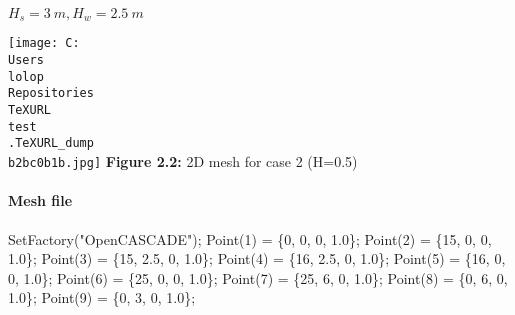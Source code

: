 \documentclass[11pt]{article}
\newenvironment{Shaded}{}{}
\newcommand{\DecValTok}[1]{\textcolor[rgb]{0.25,0.63,0.44}{{#1}}}
\newcommand{\FloatTok}[1]{\textcolor[rgb]{0.25,0.63,0.44}{{#1}}}
\newcommand{\StringTok}[1]{\textcolor[rgb]{0.25,0.44,0.63}{{#1}}}
\newcommand{\NormalTok}[1]{{#1}}
\newcommand{\OperatorTok}[1]{\textcolor[rgb]{0.40,0.40,0.40}{{#1}}}
\begin{document}
\(H_s = 3\ m, H_w = 2.5\ m\)

\texttt{[image: C:\\Users\\lolop\\Repositories\\TeXURL\\test\\.TeXURL\_dump\\b2bc0b1b.jpg]} \textbf{Figure 2.2:}
2D mesh for case 2 (H=0.5)

\hypertarget{mesh-file-1}{%
\paragraph{Mesh file}\label{mesh-file-1}}

\begin{Shaded}
\begin{Highlighting}[]
\NormalTok{SetFactory}\OperatorTok{(}\StringTok{"OpenCASCADE"}\OperatorTok{);}
\NormalTok{Point}\OperatorTok{(}\DecValTok{1}\OperatorTok{)} \OperatorTok{=} \OperatorTok{\{}\DecValTok{0}\OperatorTok{,} \DecValTok{0}\OperatorTok{,} \DecValTok{0}\OperatorTok{,} \FloatTok{1.0}\OperatorTok{\};}
\NormalTok{Point}\OperatorTok{(}\DecValTok{2}\OperatorTok{)} \OperatorTok{=} \OperatorTok{\{}\DecValTok{15}\OperatorTok{,} \DecValTok{0}\OperatorTok{,} \DecValTok{0}\OperatorTok{,} \FloatTok{1.0}\OperatorTok{\};}
\NormalTok{Point}\OperatorTok{(}\DecValTok{3}\OperatorTok{)} \OperatorTok{=} \OperatorTok{\{}\DecValTok{15}\OperatorTok{,} \FloatTok{2.5}\OperatorTok{,} \DecValTok{0}\OperatorTok{,} \FloatTok{1.0}\OperatorTok{\};}
\NormalTok{Point}\OperatorTok{(}\DecValTok{4}\OperatorTok{)} \OperatorTok{=} \OperatorTok{\{}\DecValTok{16}\OperatorTok{,} \FloatTok{2.5}\OperatorTok{,} \DecValTok{0}\OperatorTok{,} \FloatTok{1.0}\OperatorTok{\};}
\NormalTok{Point}\OperatorTok{(}\DecValTok{5}\OperatorTok{)} \OperatorTok{=} \OperatorTok{\{}\DecValTok{16}\OperatorTok{,} \DecValTok{0}\OperatorTok{,} \DecValTok{0}\OperatorTok{,} \FloatTok{1.0}\OperatorTok{\};}
\NormalTok{Point}\OperatorTok{(}\DecValTok{6}\OperatorTok{)} \OperatorTok{=} \OperatorTok{\{}\DecValTok{25}\OperatorTok{,} \DecValTok{0}\OperatorTok{,} \DecValTok{0}\OperatorTok{,} \FloatTok{1.0}\OperatorTok{\};}
\NormalTok{Point}\OperatorTok{(}\DecValTok{7}\OperatorTok{)} \OperatorTok{=} \OperatorTok{\{}\DecValTok{25}\OperatorTok{,} \DecValTok{6}\OperatorTok{,} \DecValTok{0}\OperatorTok{,} \FloatTok{1.0}\OperatorTok{\};}
\NormalTok{Point}\OperatorTok{(}\DecValTok{8}\OperatorTok{)} \OperatorTok{=} \OperatorTok{\{}\DecValTok{0}\OperatorTok{,} \DecValTok{6}\OperatorTok{,} \DecValTok{0}\OperatorTok{,} \FloatTok{1.0}\OperatorTok{\};}
\NormalTok{Point}\OperatorTok{(}\DecValTok{9}\OperatorTok{)} \OperatorTok{=} \OperatorTok{\{}\DecValTok{0}\OperatorTok{,} \DecValTok{3}\OperatorTok{,} \DecValTok{0}\OperatorTok{,} \FloatTok{1.0}\OperatorTok{\};}

\end{Highlighting}
\end{Shaded}
\end{document}

